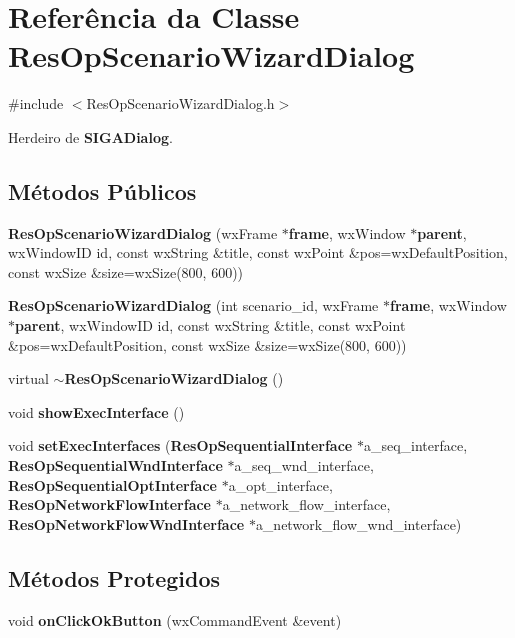 \section{Referência da Classe Res\+Op\+Scenario\+Wizard\+Dialog}
\label{class_res_op_scenario_wizard_dialog}


{\ttfamily \#include $<$Res\+Op\+Scenario\+Wizard\+Dialog.\+h$>$}



Herdeiro de {\bf S\+I\+G\+A\+Dialog}.

\subsection*{Métodos Públicos}
\begin{DoxyCompactItemize}
\item 
{\bf Res\+Op\+Scenario\+Wizard\+Dialog} (wx\+Frame $\ast${\bf frame}, wx\+Window $\ast${\bf parent}, wx\+Window\+ID id, const wx\+String \&title, const wx\+Point \&pos=wx\+Default\+Position, const wx\+Size \&size=wx\+Size(800, 600))
\item 
{\bf Res\+Op\+Scenario\+Wizard\+Dialog} (int scenario\+\_\+id, wx\+Frame $\ast${\bf frame}, wx\+Window $\ast${\bf parent}, wx\+Window\+ID id, const wx\+String \&title, const wx\+Point \&pos=wx\+Default\+Position, const wx\+Size \&size=wx\+Size(800, 600))
\item 
virtual {\bf $\sim$\+Res\+Op\+Scenario\+Wizard\+Dialog} ()
\item 
void {\bf show\+Exec\+Interface} ()
\item 
void {\bf set\+Exec\+Interfaces} ({\bf Res\+Op\+Sequential\+Interface} $\ast$a\+\_\+seq\+\_\+interface, {\bf Res\+Op\+Sequential\+Wnd\+Interface} $\ast$a\+\_\+seq\+\_\+wnd\+\_\+interface, {\bf Res\+Op\+Sequential\+Opt\+Interface} $\ast$a\+\_\+opt\+\_\+interface, {\bf Res\+Op\+Network\+Flow\+Interface} $\ast$a\+\_\+network\+\_\+flow\+\_\+interface, {\bf Res\+Op\+Network\+Flow\+Wnd\+Interface} $\ast$a\+\_\+network\+\_\+flow\+\_\+wnd\+\_\+interface)
\end{DoxyCompactItemize}
\subsection*{Métodos Protegidos}
\begin{DoxyCompactItemize}
\item 
void {\bf on\+Click\+Ok\+Button} (wx\+Command\+Event \&event)
\end{DoxyCompactItemize}

